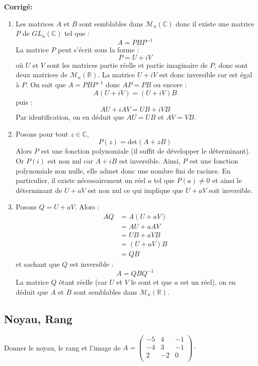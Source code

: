 \documentclass[a4paper,twoside,french,11pt]{VcCours}
\newcommand{\corr}{\textbf{Corrigé:}}
\begin{document}
\corr \begin{enumerate}
\item Les matrices $A$ et $B$ sont semblables dans $\mathcal{M}_n(\mathbb{C})$ donc il existe une matrice $P$ de $GL_n(\mathbb{C})$ tel que :
$$ A=PBP^{-1}$$
La matrice $P$ peut s'écrit sous la forme :
$$ P = U+i V$$
où $U$ et $V$ sont les matrices \og partie réelle \fg et \og partie imaginaire \fg de $P$, donc sont deux matrices de $\mathcal{M}_n(\mathbb{R})$. La matrice $U+iV$ est donc inversible car est égal à $P$. On sait que $A=PBP^{-1}$ donc $AP=PB$ ou encore :
$$ A(U+iV) = (U+iV)B$$
puis :
$$ AU+ i AV = UB + i VB$$
Par identification, on en déduit que $AU=UB$ et $AV=VB$.
\item Posons pour tout $z \in \mathbb{C}$,
$$ P(z) = \textrm{det}(A+zB)$$
Alors $P$ est une fonction polynomiale (il suffit de développer le déterminant). Or $P(i)$ est non nul car $A+iB$ est inversible. Ainsi, $P$ est une fonction polynomiale non nulle, elle admet donc une nombre fini de racines. En particulier, il existe nécessairement un réel $a$ tel que $P(a) \neq 0$ et ainsi le déterminant de $U+aV$ est non nul ce qui implique que $U+aV$ soit inversible.
\item Posons $Q=U+aV$. Alors :
\begin{align*}
AQ & = A(U+aV) \\
& = AU + a AV \\
& = UB + a VB \\
& = (U+aV)B \\
& = QB
\end{align*}
et sachant que $Q$ est inversible :
$$ A= QBQ^{-1}$$
La matrice $Q$ étant réelle (car $U$ et $V$ le sont et que $a$ est un réel), on en déduit que $A$ et $B$ sont semblables dans $\mathcal{M}_n(\mathbb{R})$.
\end{enumerate}




\subsection{\large Noyau, Rang}




\begin{Exercice}{} Donner le noyau, le rang et l'image de $A = \begin{pmatrix}
-5 & 4 & -1 \\
-4 & 3 & - 1 \\
2 	 & -2 & 0 \\
\end{pmatrix}\cdot$
\end{Exercice}
\end{document}
